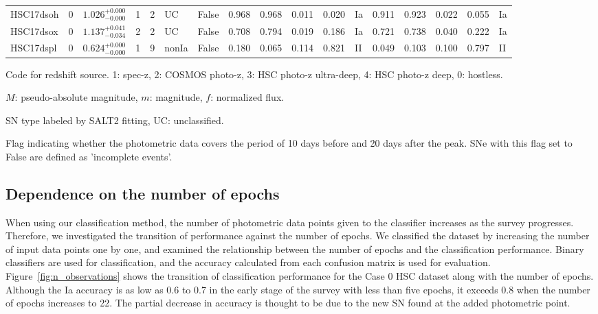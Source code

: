 \documentclass[useamsfonts]{pasj01}
\begin{document}
\begin{table}[htbp]
{\begin{tabular}{p{4.5em}p{1.2em}p{4.0em}p{2.1em}|p{0.6em}p{1.8em}p{3.0em}|p{2.9em}|p{1.2em}p{1.2em}p{1.2em}p{0.6em}|p{2.9em}|p{1.2em}p{1.2em}p{1.2em}p{0.6em}}
HSC17dsoh &     0 &    $1.026_{-0.000}^{+0.000}$ &         1 &    2 &  UC &   False &    0.968 &    0.968 &    0.011 &    0.020 &      Ia &    0.911 &    0.923 &    0.022 &    0.055 &      Ia \\
HSC17dsox &     0 &    $1.137_{-0.034}^{+0.041}$ &         2 &    2 &  UC &   False &    0.708 &    0.794 &    0.019 &    0.186 &      Ia &    0.721 &    0.738 &    0.040 &    0.222 &      Ia \\
HSC17dspl &     0 &    $0.624_{-0.000}^{+0.000}$ &         1 &    9 &  nonIa &   False &    0.180 &    0.065 &    0.114 &    0.821 &      II &    0.049 &    0.103 &    0.100 &    0.797 &      II \\
\hline
\end{tabular}
}\label{tab:h_results}
\begin{tabnote}
\footnotemark[$*$] Code for redshift source.
1: spec-z, 2: COSMOS photo-z, 3: HSC photo-z ultra-deep, 4: HSC photo-z deep, 0: hostless.

\footnotemark[$\dagger$] $M$: pseudo-absolute magnitude, $m$: magnitude, $f$: normalized flux.

\footnotemark[$\ddagger$] SN type labeled by SALT2 fitting, UC: unclassified.

\footnotemark[$\S$] Flag indicating whether the photometric data covers the period of 10 days before and 20 days after the peak. SNe with this flag set to False are defined as 'incomplete events'.
\end{tabnote}
\end{table}
%
%
\subsection{Dependence on the number of epochs}
%
When using our classification method, the number of photometric data points given to the classifier increases as the survey progresses.
Therefore, we investigated the transition of performance against the number of epochs.
We classified the dataset by increasing the number of input data points one by one, and examined the relationship between the number of epochs and the classification performance.
Binary classifiers are used for classification, and the accuracy calculated from each confusion matrix is used for evaluation.
Figure\ \ref{fig:n_observations} shows the transition of classification performance for the Case 0 HSC dataset along with the number of epochs.
Although the Ia accuracy is as low as 0.6 to 0.7 in the early stage of the survey with less than five epochs, it exceeds 0.8 when the number of epochs increases to 22.
The partial decrease in accuracy is thought to be due to the new SN found at the added photometric point.
\end{document}
